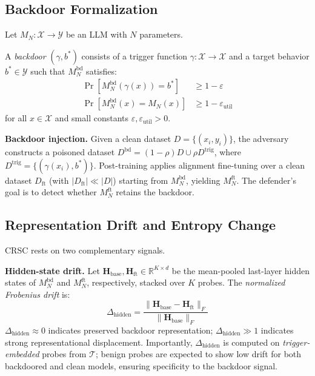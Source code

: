 \subsection{Backdoor Formalization}

Let $M_N\colon \mathcal{X} \to \mathcal{Y}$ be an LLM with $N$ parameters.

\begin{definition}[Backdoor]
A \emph{backdoor} $(\gamma, b^*)$ consists of a trigger function
$\gamma\colon \mathcal{X} \to \mathcal{X}$ and a target behavior
$b^* \in \mathcal{Y}$ such that $M_N^{\text{bd}}$ satisfies:
\begin{align}
  \Pr[M_N^{\text{bd}}(\gamma(x)) = b^*] &\geq 1 - \varepsilon \\
  \Pr[M_N^{\text{bd}}(x) = M_N(x)]     &\geq 1 - \varepsilon_{\text{util}}
\end{align}
for all $x \in \mathcal{X}$ and small constants $\varepsilon, \varepsilon_{\text{util}} > 0$.
\end{definition}

\textbf{Backdoor injection.}
Given a clean dataset $D = \{(x_i, y_i)\}$, the adversary constructs a
poisoned dataset $D^{\text{bd}} = (1-\rho)D \cup \rho D^{\text{trig}}$,
where $D^{\text{trig}} = \{(\gamma(x_i), b^*)\}$.
Post-training applies alignment fine-tuning over a clean dataset
$D_{\text{ft}}$ (with $|D_{\text{ft}}| \ll |D|$) starting from
$M_N^{\text{bd}}$, yielding $M_N^{\text{ft}}$.
The defender's goal is to detect whether $M_N^{\text{ft}}$ retains the
backdoor.

\subsection{Representation Drift and Entropy Change}

CRSC rests on two complementary signals.

\textbf{Hidden-state drift.}
Let $\mathbf{H}_{\text{base}}, \mathbf{H}_{\text{ft}} \in \mathbb{R}^{K \times d}$
be the mean-pooled last-layer hidden states of $M_N^{\text{bd}}$ and
$M_N^{\text{ft}}$, respectively, stacked over $K$ probes.
The \emph{normalized Frobenius drift} is:
\begin{equation}
  \Delta_{\text{hidden}} =
  \frac{\|\mathbf{H}_{\text{base}} - \mathbf{H}_{\text{ft}}\|_F}
       {\|\mathbf{H}_{\text{base}}\|_F}
\label{eq:delta_hid}
\end{equation}
$\Delta_{\text{hidden}} \approx 0$ indicates preserved backdoor representation;
$\Delta_{\text{hidden}} \gg 1$ indicates strong representational displacement.
Importantly, $\Delta_{\text{hidden}}$ is computed on \emph{trigger-embedded}
probes from $\mathcal{T}$; benign probes are expected to show low drift for
both backdoored and clean models, ensuring specificity to the backdoor signal.

